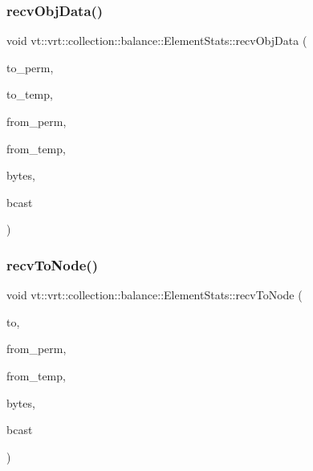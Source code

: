 \subsubsection{\texorpdfstring{recv\+Obj\+Data()}{recvObjData()}}
{\footnotesize\ttfamily void vt\+::vrt\+::collection\+::balance\+::\+Element\+Stats\+::recv\+Obj\+Data (\begin{DoxyParamCaption}\item[{\hyperlink{namespacevt_1_1vrt_1_1collection_1_1balance_a14c8d2c972f2913aa3f1636e5be0a120}{Element\+I\+D\+Type}}]{to\+\_\+perm,  }\item[{\hyperlink{namespacevt_1_1vrt_1_1collection_1_1balance_a14c8d2c972f2913aa3f1636e5be0a120}{Element\+I\+D\+Type}}]{to\+\_\+temp,  }\item[{\hyperlink{namespacevt_1_1vrt_1_1collection_1_1balance_a14c8d2c972f2913aa3f1636e5be0a120}{Element\+I\+D\+Type}}]{from\+\_\+perm,  }\item[{\hyperlink{namespacevt_1_1vrt_1_1collection_1_1balance_a14c8d2c972f2913aa3f1636e5be0a120}{Element\+I\+D\+Type}}]{from\+\_\+temp,  }\item[{double}]{bytes,  }\item[{bool}]{bcast }\end{DoxyParamCaption})}

\mbox{\label{structvt_1_1vrt_1_1collection_1_1balance_1_1_element_stats_aa7eb11ba5b2787b129925d9f2cd0ac89}} 
\subsubsection{\texorpdfstring{recv\+To\+Node()}{recvToNode()}}
{\footnotesize\ttfamily void vt\+::vrt\+::collection\+::balance\+::\+Element\+Stats\+::recv\+To\+Node (\begin{DoxyParamCaption}\item[{\hyperlink{namespacevt_a866da9d0efc19c0a1ce79e9e492f47e2}{Node\+Type}}]{to,  }\item[{\hyperlink{namespacevt_1_1vrt_1_1collection_1_1balance_a14c8d2c972f2913aa3f1636e5be0a120}{Element\+I\+D\+Type}}]{from\+\_\+perm,  }\item[{\hyperlink{namespacevt_1_1vrt_1_1collection_1_1balance_a14c8d2c972f2913aa3f1636e5be0a120}{Element\+I\+D\+Type}}]{from\+\_\+temp,  }\item[{double}]{bytes,  }\item[{bool}]{bcast }\end{DoxyParamCaption})}

